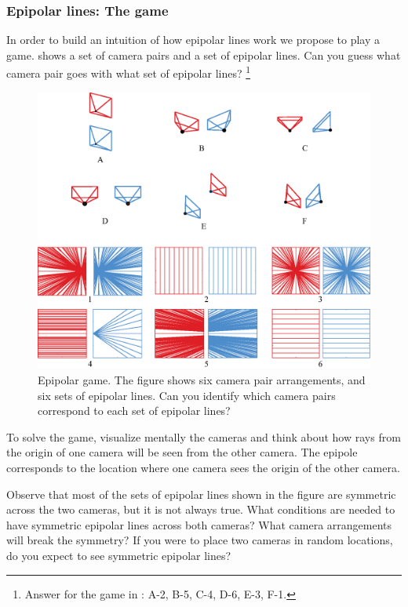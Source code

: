 \subsubsection{Epipolar lines: The game}
In order to build an intuition of how epipolar lines work we propose to play a game. 
\Fig{\ref{fig:epipolarlinesgame}} shows a set of camera pairs and a set of epipolar lines. Can you guess what camera pair goes with what set of epipolar lines? \footnote{Answer for the game in \fig{\ref{fig:epipolarlinesgame}}: A-2, B-5, C-4, D-6, E-3, F-1.}


\begin{figure}[t]
\centerline{
\includegraphics[width=1\linewidth]{figures/3d_scene_understanding/epipolar_game_play.eps}
}
\caption{Epipolar game. The figure shows six camera pair arrangements, and six sets of epipolar lines. Can you identify which camera pairs correspond to each set of epipolar lines?}
\label{fig:epipolarlinesgame}
\end{figure}

To solve the game, visualize mentally the cameras and think about how rays from the origin of one camera will be seen from the other camera. The epipole corresponds to the location where one camera sees the origin of the other camera.  

Observe that most of the sets of epipolar lines shown in the figure are symmetric across the two cameras, but it is not always true. What conditions are needed to have symmetric epipolar lines across both cameras? What camera arrangements will break the symmetry? If you were to place two cameras in random locations, do you expect to see symmetric epipolar lines?


